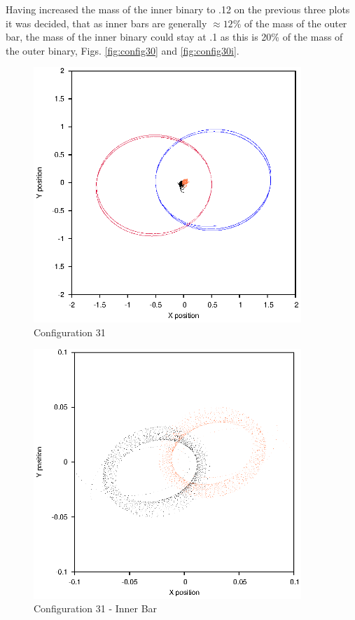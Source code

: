 \documentclass[a4paper,12pt]{article}
\begin{document}
Having increased the mass of the inner binary to .12 on the previous three plots it was decided, that as inner bars are generally $\approx12\%$ of the mass of the outer bar, the mass of the inner binary could stay at .1
as this is 20\% of the mass of the outer binary, Figs. \ref{fig:config30} and \ref{fig:config30i}.

\begin{figure}[H]
\centering
\includegraphics[width=0.9\textwidth]{./2017results/1-1-102-1/Orbit.eps}
\caption{Configuration 31}
\label{fig:config31}
\end{figure}
\begin{figure}[H]
\centering
\includegraphics[width=0.9\textwidth]{./2017results/1-1-102-1/Inner.eps}
\caption{Configuration 31 - Inner Bar}
\label{fig:config31i}
\end{figure}
\end{document}
